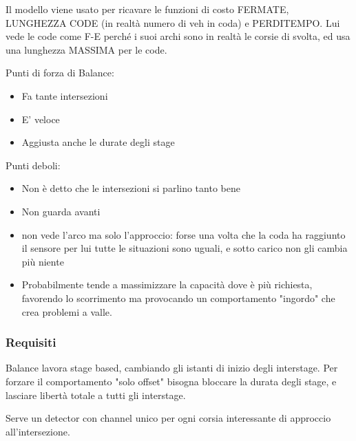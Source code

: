 Il modello viene usato per ricavare le funzioni di costo FERMATE, LUNGHEZZA CODE (in realtà numero di veh in coda) e PERDITEMPO.
Lui vede le code come F-E perché i suoi archi sono in realtà le corsie di svolta, ed usa una lunghezza MASSIMA per le code.

Punti di forza di Balance:
\begin{itemize}
\item Fa tante intersezioni
\item E' veloce
\item Aggiusta anche le durate degli stage
\end{itemize}

Punti deboli:
\begin{itemize}
\item Non è detto che le intersezioni si parlino tanto bene
\item Non guarda avanti
\item non vede l'arco ma solo l'approccio: forse una volta che la coda ha raggiunto il sensore per lui tutte le situazioni sono uguali, e sotto carico non gli cambia più niente
\item Probabilmente tende a massimizzare la capacità dove è più richiesta, favorendo lo scorrimento ma provocando un comportamento "ingordo" che crea problemi a valle.
\end{itemize}

\subsubsection{Requisiti}
Balance lavora stage based, cambiando gli istanti di inizio degli interstage.
Per forzare il comportamento "solo offset" bisogna bloccare la durata degli stage, e lasciare libertà totale a tutti gli interstage.

Serve un detector con channel unico per ogni corsia interessante di approccio all'intersezione.